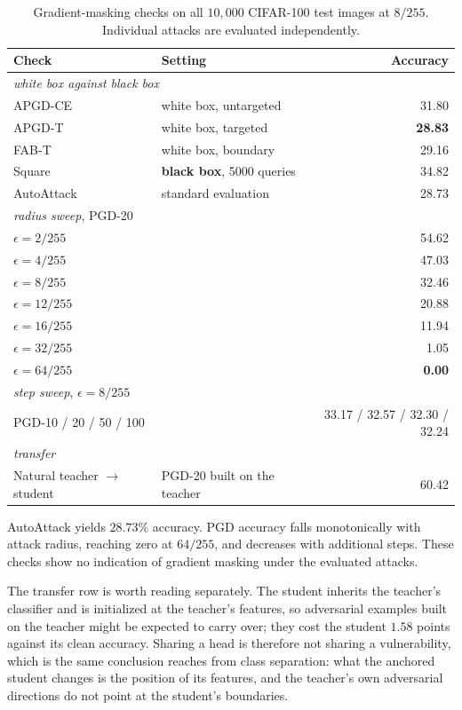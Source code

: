 \begin{table}[!htbp]
  \centering \small \setlength{\tabcolsep}{5pt}
  \caption{Gradient-masking checks on all $10{,}000$ CIFAR-100 test images at $8/255$.
  Individual attacks are evaluated independently.}
  \label{tab:gradmask}
  \begin{tabular}{llr}
    \toprule
    Check & Setting & Accuracy \\
    \midrule
    \multicolumn{3}{l}{\emph{white box against black box}} \\
    APGD-CE            & white box, untargeted & 31.80 \\
    APGD-T             & white box, targeted   & \textbf{28.83} \\
    FAB-T              & white box, boundary   & 29.16 \\
    Square             & \textbf{black box}, 5000 queries & 34.82 \\
    \midrule
    AutoAttack & standard evaluation & 28.73 \\
    \midrule
    \multicolumn{3}{l}{\emph{radius sweep}, PGD-20} \\
    $\epsilon = 2/255$  & & 54.62 \\
    $\epsilon = 4/255$  & & 47.03 \\
    $\epsilon = 8/255$  & & 32.46 \\
    $\epsilon = 12/255$ & & 20.88 \\
    $\epsilon = 16/255$ & & 11.94 \\
    $\epsilon = 32/255$ & & 1.05 \\
    $\epsilon = 64/255$ & & \textbf{0.00} \\
    \midrule
    \multicolumn{3}{l}{\emph{step sweep}, $\epsilon = 8/255$} \\
    PGD-10 / 20 / 50 / 100 & & 33.17 / 32.57 / 32.30 / 32.24 \\
    \midrule
    \multicolumn{3}{l}{\emph{transfer}} \\
    Natural teacher $\rightarrow$ student & PGD-20 built on the teacher & 60.42 \\
    \bottomrule
  \end{tabular}
\end{table}

AutoAttack yields $28.73\%$ accuracy. PGD accuracy falls monotonically with attack radius, reaching
zero at $64/255$, and decreases with additional steps. These checks show no indication of gradient
masking under the evaluated attacks.

The transfer row is worth reading separately. The student inherits the teacher's classifier and is
initialized at the teacher's features, so adversarial examples built on the teacher might be expected
to carry over; they cost the student $1.58$ points against its clean accuracy. Sharing a head is
therefore not sharing a vulnerability, which is the same conclusion  reaches from
class separation: what the anchored student changes is the position of its features, and the teacher's own
adversarial directions do not point at the student's boundaries.

